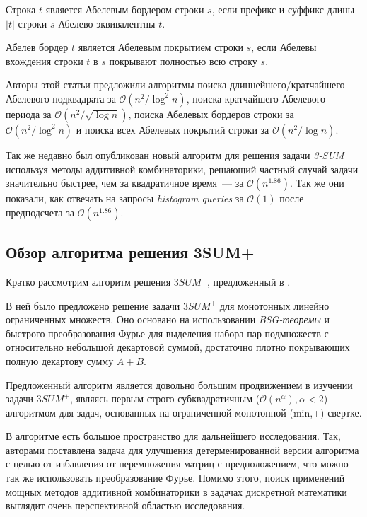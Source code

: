 \begin{definition}
Строка $t$ является Абелевым бордером строки $s$, если префикс и суффикс длины $|t|$ строки $s$ Абелево эквивалентны $t$.
\end{definition}

\begin{definition}
Абелев бордер $t$ является Абелевым покрытием строки $s$, если Абелевы вхождения строки $t$ в $s$ покрывают полностью всю строку $s$.
\end{definition}

Авторы этой статьи предложили алгоритмы поиска длиннейшего/кратчайшего Абелевого подквадрата за $\mathcal{O}(n^2 / \log^2 n)$, поиска кратчайшего Абелевого периода за $\mathcal{O}(n^2 / \sqrt{\log n})$, поиска Абелевых бордеров строки за $\mathcal{O}(n^2 / \log^2 n)$ и поиска всех Абелевых покрытий строки за $\mathcal{O}(n^2 / \log n)$.

Так же недавно был опубликован новый алгоритм для решения задачи \textit{3-SUM} используя методы аддитивной комбинаторики, решающий частный случай задачи значительно быстрее, чем за квадратичное время~--- за $\mathcal{O}(n^{1.86})$. Так же они показали, как отвечать на запросы \textit{histogram queries} за $\mathcal{O}(1)$ после предподсчета за $\mathcal{O}(n^{1.86})$.

\subsection{Обзор алгоритма решения 3SUM+}

Кратко рассмотрим алгоритм решения $3SUM^+$, предложенный в \cite{2}. 

В ней было предложено решение задачи $3SUM^+$ для монотонных линейно ограниченных множеств. Оно основано на использовании \textit{BSG-теоремы} и быстрого преобразования Фурье для выделения набора пар подмножеств с относительно небольшой декартовой суммой, достаточно плотно покрывающих полную декартову сумму $A+B$.

Предложенный алгоритм является довольно большим продвижением в изучении задачи $3SUM^+$, являясь первым строго субквадратичным ($\mathcal{O}(n^\alpha), \alpha < 2$) алгоритмом для задач, основанных на ограниченной монотонной (min,+) свертке.

В алгоритме есть большое пространство для дальнейшего исследования. Так, авторами поставлена задача для улучшения детерменированной версии алгоритма с целью от избавления от перемножения матриц с предположением, что можно так же использовать преобразование Фурье. Помимо этого, поиск применений мощных методов аддитивной комбинаторики в задачах дискретной математики выглядит очень перспективной областью исследования.
